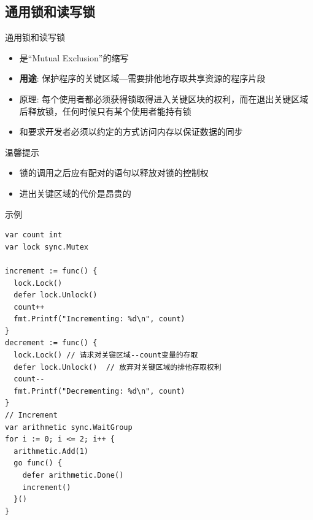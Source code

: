 \subsection{通用锁\Mutex 和读写锁\RWMutex }
\begin{frame}{通用锁\Mutex 和读写锁\RWMutex }
    \begin{itemize}
        \item \Mutex 是``Mutual Exclusion''的缩写
        \item \textbf{用途}: 保护程序的\alert{关键区域}---需要排他地存取共享资源的程序片段
        \item 原理: 每个使用者都必须获得锁取得进入关键区块的权利，而在退出关键区域后释放锁，\alert{任何时候只有某个使用者能持有锁}
        \item \Mutex 和\RWMutex 要求开发者必须以\alert{约定的方式}访问内存以保证数据的同步
    \end{itemize}


    \pause
    \begin{exampleblock}{温馨提示}
        \begin{itemize}
            \item 锁的调用之后应有配对的语句以释放对锁的控制权
            \item \alert{进出关键区域的代价是昂贵的}
        \end{itemize}    
    \end{exampleblock}
\end{frame}

\iffalse
\begin{frame}[fragile]{示例}
\begin{lstlisting}
var count int
var lock sync.Mutex

increment := func() {
  lock.Lock()
  defer lock.Unlock()
  count++
  fmt.Printf("Incrementing: %d\n", count)
}
decrement := func() {
  lock.Lock() // 请求对关键区域--count变量的存取
  defer lock.Unlock()  // 放弃对关键区域的排他存取权利
  count--
  fmt.Printf("Decrementing: %d\n", count)
}
// Increment
var arithmetic sync.WaitGroup
for i := 0; i <= 2; i++ {
  arithmetic.Add(1)
  go func() {
    defer arithmetic.Done()
    increment()
  }()
}
\end{lstlisting}
\end{frame}

